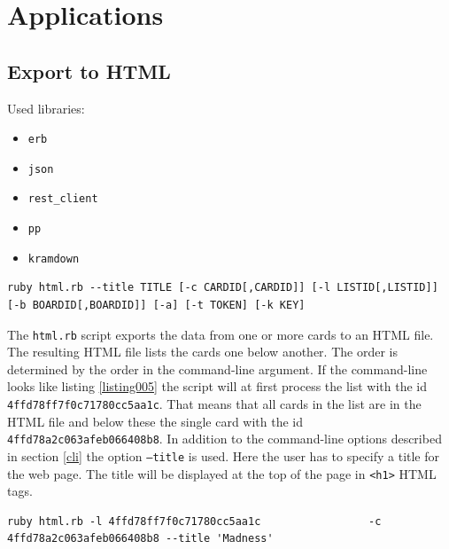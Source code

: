 
\chapter{Applications}

\section{Export to HTML}\label{html.rb}

Used libraries:
\begin{itemize}
	\item \texttt{erb}
	\item \texttt{json}
	\item \texttt{rest\_client}
	\item \texttt{pp}
	\item \texttt{kramdown}
\end{itemize}

\begin{lstlisting}[aboveskip=1\baselineskip, style=bash, caption=\texttt{html.rb} usage., label=listing026]
ruby html.rb --title TITLE [-c CARDID[,CARDID]] [-l LISTID[,LISTID]] [-b BOARDID[,BOARDID]] [-a] [-t TOKEN] [-k KEY]
\end{lstlisting}

The \texttt{html.rb} script exports the data from one or more cards to an HTML file. The resulting HTML file lists the cards one below another. The order is determined by the order in the command-line argument. If the command-line looks like listing \ref{listing005} the script will at first process the list with the id \texttt{4ffd78ff7f0c71780cc5aa1c}. That means that all cards in the list are in the HTML file and below these the single card with the id \texttt{4ffd78a2c063afeb066408b8}. In addition to the command-line options described in section \ref{cli} the option \texttt{--title} is used. Here the user has to specify a title for the web page. The title will be displayed at the top of the page in \lstinline{<h1>} HTML tags.

\begin{lstlisting}[aboveskip=1\baselineskip, style=bash, caption=Example of a \texttt{html.rb} call., label=listing005]
ruby html.rb -l 4ffd78ff7f0c71780cc5aa1c                 -c 4ffd78a2c063afeb066408b8 --title 'Madness'
\end{lstlisting} 

